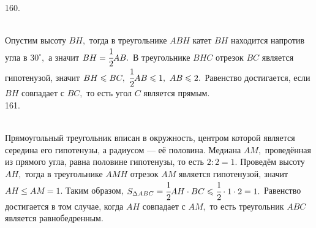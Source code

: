 \documentclass[12pt]{article}
\begin{document}
160. \begin{figure}[ht!]
\end{figure}\\
Опустим высоту $BH,$ тогда в треугольнике $ABH$ катет $BH$ находится напротив угла в $30^\circ,$ а значит $BH=\cfrac{1}{2}AB.$ В треугольнике $BHC$ отрезок $BC$ является гипотенузой, значит $BH\leqslant BC,\ \cfrac{1}{2}AB \leqslant 1,\ AB \leqslant2.$ Равенство достигается, если $BH$ совпадает с $BC,$ то есть угол $C$ является прямым.\\
161. \begin{figure}[ht!]
\end{figure}\\
Прямоугольный треугольник вписан в окружность, центром которой является середина его гипотенузы, а радиусом --- её половина. Медиана $AM,$ проведённая из прямого угла, равна половине гипотенузы, то есть $2:2=1.$ Проведём высоту $AH,$ тогда в треугольнике $AMH$ отрезок $AM$ является гипотенузой, значит $AH\leqslant AM=1.$ Таким образом, $S_{\Delta ABC}=\cfrac{1}{2}AH\cdot BC \leqslant \cfrac{1}{2}\cdot 1 \cdot 2=1.$ Равенство достигается в том случае, когда $AH$ совпадает с $AM,$ то есть треугольник $ABC$ является равнобедренным.\newpage\noindent
\end{document}
